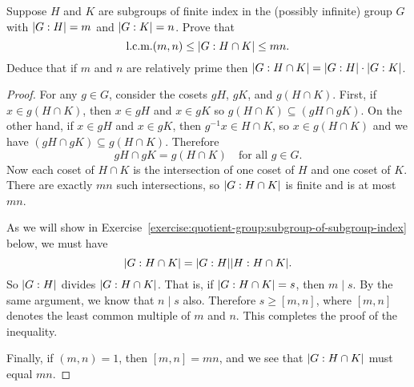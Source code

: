 \label{exercise:quotient-group:index-subgroup-intersection}
Suppose $H$ and $K$ are subgroups of finite index in the (possibly
infinite) group $G$ with $\lvert{G:H}\rvert = m$ and $\lvert{G:K}\rvert = n$. Prove
that
\begin{equation*}
  \text{l.c.m.}(m,n)\leq\lvert{G:H\cap K}\rvert\leq mn.
\end{equation*}
Deduce that if $m$ and $n$ are relatively prime then
$\lvert{G:H\cap K}\rvert = \lvert{G:H}\rvert\cdot\lvert{G:K}\rvert$.
\begin{proof}
  For any $g\in G$, consider the cosets $gH$, $gK$, and $g(H\cap
  K)$. First, if $x\in g(H\cap K)$, then $x\in gH$ and $x\in gK$ so
  $g(H\cap K)\subseteq(gH\cap gK)$. On the other hand, if $x\in gH$
  and $x\in gK$, then $g^{-1}x\in H\cap K$, so $x\in g(H\cap K)$ and
  we have $(gH\cap gK)\subseteq g(H\cap K)$. Therefore
  \begin{equation*}
    gH\cap gK = g(H\cap K)
    \quad\text{for all $g\in G$}.
  \end{equation*}
  Now each coset of $H\cap K$ is the intersection of one coset of $H$
  and one coset of $K$. There are exactly $mn$ such intersections, so
  $\lvert{G:H\cap K}\rvert$ is finite and is at most $mn$.

  As we will show in
  Exercise~\ref{exercise:quotient-group:subgroup-of-subgroup-index}
  below, we must have
  \begin{equation*}
    \lvert{G:H\cap K}\rvert = \lvert{G:H}\rvert\lvert{H:H\cap K}\rvert.
  \end{equation*}
  So $\lvert{G:H}\rvert$ divides $\lvert{G:H\cap K}\rvert$. That is, if
  $\lvert{G:H\cap K}\rvert = s$, then $m\mid s$. By the same argument, we know
  that $n\mid s$ also. Therefore $s\geq[m,n]$, where $[m,n]$ denotes
  the least common multiple of $m$ and $n$. This completes the proof
  of the inequality.

  Finally, if $(m,n) = 1$, then $[m,n] = mn$, and we see that
  $\lvert{G:H\cap K}\rvert$ must equal $mn$.
\end{proof}

